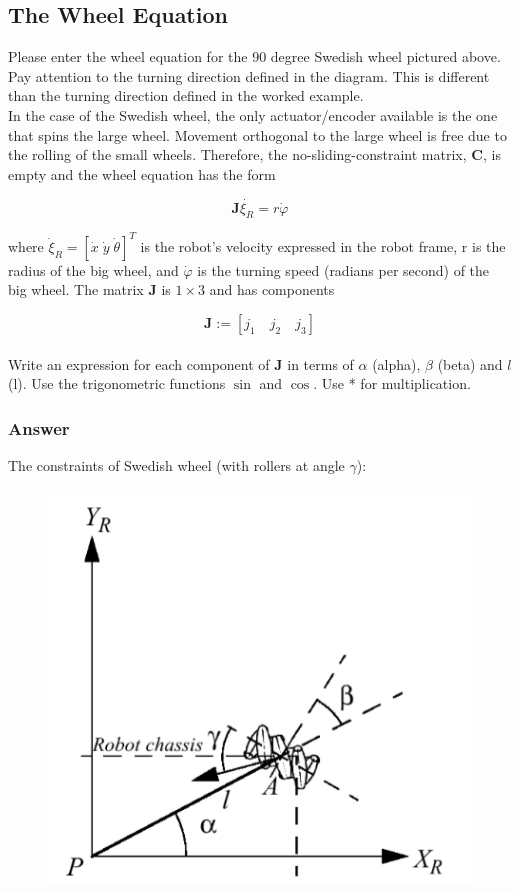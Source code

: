 \documentclass[12pt]{article}
\begin{document}
\pagebreak

\subsection*{The Wheel Equation}

Please enter the wheel equation for the 90 degree Swedish wheel pictured above. Pay attention to the turning direction defined in the diagram. This is different than the turning direction defined in the worked example. \\

\noindent In the case of the Swedish wheel, the only actuator/encoder available is the one that spins the large wheel. Movement orthogonal to the large wheel is free due to the rolling of the small wheels. Therefore, the no-sliding-constraint matrix, $\mathbf{C}$, is empty and the wheel equation has the form 

\begin{equation*}
	\mathbf{J} \dot{\xi_R} = r \dot{\varphi}
\end{equation*}

\noindent where $\dot{\xi}_R = [\dot{x} \; \dot{y} \; \dot{\theta}]^T$ is the robot's velocity expressed in the robot frame, r is the radius of the big wheel, and $\dot{\varphi}$ is the turning speed (radians per second) of the big wheel. The matrix $\mathbf{J}$ is $1 \times 3$ and has components 

\begin{equation*}
	\mathbf{J} := [j_1 \quad j_2 \quad j_3]
\end{equation*} \\

\noindent Write an expression for each component of $\mathbf{J}$ in terms of $\alpha$ (alpha), $\beta$ (beta) and $l$ (l). Use the trigonometric functions $\sin$ and $\cos$. Use * for multiplication.

\subsubsection*{Answer}

The constraints of Swedish wheel (with rollers at angle $\gamma$):

\begin{figure}[h]
	\centering
	\includegraphics[width=0.5\linewidth]{swedish_wheel}
\end{figure}
\end{document}
